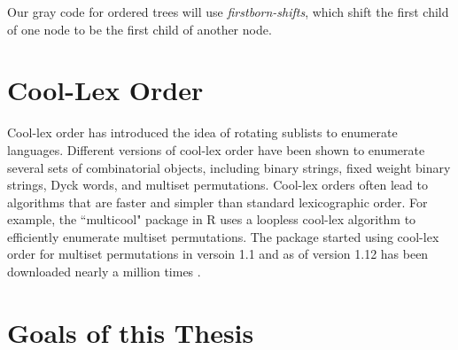 Our gray code for ordered trees will use \emph{firstborn-shifts}, which shift the first child of one node to be the first child of another node.


\section{Cool-Lex Order}
Cool-lex order has introduced the idea of rotating sublists to enumerate languages.  Different versions of cool-lex order have been shown to enumerate several sets of combinatorial objects, including binary strings, fixed weight binary strings, Dyck words, and multiset permutations.  Cool-lex orders often lead to algorithms that are faster and simpler than standard lexicographic order.  For example, the ``multicool" package in R uses a loopless cool-lex algorithm to efficiently enumerate multiset permutations.   The package started using cool-lex order for multiset permutations in versoin 1.1 and as of version 1.12 has been downloaded nearly a million times \cite{multicool_2021}.



\section{Goals of this Thesis}



